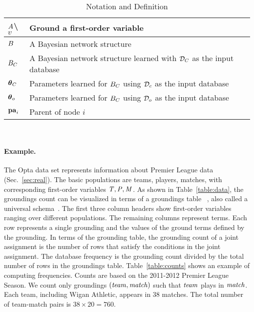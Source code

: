 {{\begin{table}
{\begin{tabular}{ll}
 	 	      			$A$\textbackslash$v$& Ground a first-order variable\\\hline
 	 	      			
 	 	      			$B$&A Bayesian network structure\\\hline
 	 	      			$B_{C}$ & A Bayesian network structure learned with $\mathcal{D}_{C}$ as the input database\\\hline
 	 	      			$\boldsymbol{\theta}_{C}$ & Parameters learned for $B_{C}$ using $\mathcal{D}_{c}$  as the input database\\\hline
 	 	      			$\boldsymbol{\theta}_{o}$ & Parameters learned for $B_{C}$ using $\mathcal{D}_{o}$  as the input database\\\hline
 	 	      			$\mathbf{pa}_{i}$&Parent of node $i$\\\hline
 	 	      		\end{tabular}} 	\caption[Table of Notations]{Notation and Definition	\label{table:notation}}
 	 	      	\end{table}\\
			
			\paragraph{Example.}
\label{sec:example}
%
The Opta data set represents information about Premier League data %
(Sec.~\ref{sec:real}). 
The basic populations are teams, players, matches, with 
corresponding first-order variables $\it{T}, \it{P}, \it{M}$. As shown in Table~\ref{table:data}, the groundings count can be visualized in terms of a groundings table ~\citep{Schulte2014}, also called a universal schema~\citep{Riedel2013}. 
The first three column headers show first-order variables ranging over different populations. The remaining columns represent terms. Each row represents a single grounding and the values of the ground terms defined by the grounding.
In terms of the grounding table, the grounding count of a joint assignment is the number of rows that satisfy the conditions in the joint assignment. The database frequency is the grounding count divided by the total number of rows in the groundings table. Table~\ref{table:counts} shows an example of computing frequencies. Counts are based on the 2011-2012 Premier League Season. We count only groundings $(\it{team},\it{match})$ such that $\it{team}$ plays in $\it{match}$. Each team, including Wigan Athletic, appears in 38 matches. The total number of team-match pairs is $38 \times 20 = 760$.

}}
